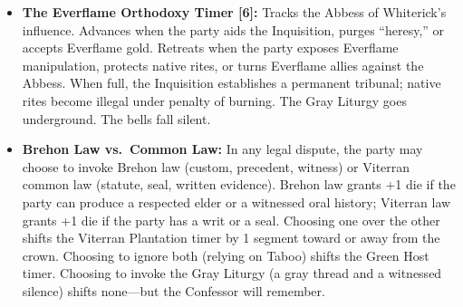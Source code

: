 \begin{itemize}
\item \textbf{The Everflame Orthodoxy Timer [6]:} Tracks the Abbess of Whiterick's influence. Advances when the party aids the Inquisition, purges ``heresy,'' or accepts Everflame gold. Retreats when the party exposes Everflame manipulation, protects native rites, or turns Everflame allies against the Abbess. When full, the Inquisition establishes a permanent tribunal; native rites become illegal under penalty of burning. The Gray Liturgy goes underground. The bells fall silent.
\item \textbf{Brehon Law vs.\ Common Law:} In any legal dispute, the party may choose to invoke Brehon law (custom, precedent, witness) or Viterran common law (statute, seal, written evidence). Brehon law grants +1 die if the party can produce a respected elder or a witnessed oral history; Viterran law grants +1 die if the party has a writ or a seal. Choosing one over the other shifts the Viterran Plantation timer by 1 segment toward or away from the crown. Choosing to ignore both (relying on Taboo) shifts the Green Host timer. Choosing to invoke the Gray Liturgy (a gray thread and a witnessed silence) shifts none---but the Confessor will remember.
\end{itemize}

